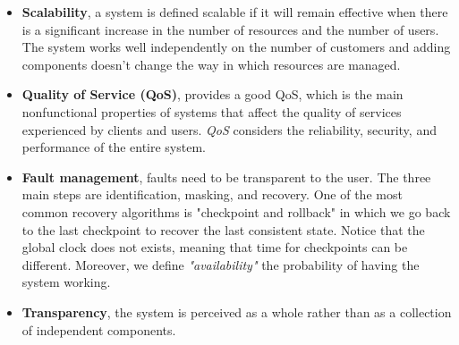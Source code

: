 \begin{itemize}
    \item \textbf{Scalability}, a system is defined scalable if it will remain effective when there is a significant increase in the number of resources and the number of users. The system works well independently on the number of customers and adding components doesn't change the way in which resources are managed.
    \item \textbf{Quality of Service (QoS)}, provides a good QoS, which is the main nonfunctional properties of systems that affect the quality of services experienced by clients and users. \textit{QoS} considers the reliability, security, and performance of the entire system.
    \item \textbf{Fault management}, faults need to be transparent to the user. The three main steps are identification, masking, and recovery. One of the most common recovery algorithms is "checkpoint and rollback" in which we go back to the last checkpoint to recover the last consistent state. Notice that the global clock does not exists, meaning that time for checkpoints can be different. Moreover, we define \textit{"availability"} the probability of having the system working.
    \item \textbf{Transparency}, the system is perceived as a whole rather than as a collection of independent components.
\end{itemize}

